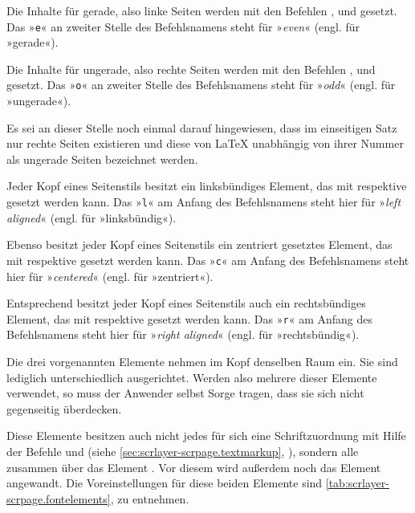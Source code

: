 Die Inhalte für gerade, also linke Seiten werden mit den
Befehlen ,  und  gesetzt. Das
»\texttt{e}« an zweiter Stelle des Befehlsnamens steht %
\iffalse dabei \fi %
für »\emph{even}« (engl. für »gerade«).

Die Inhalte für ungerade, also rechte Seiten werden mit
den Befehlen ,  und  gesetzt. Das
»\texttt{o}« an zweiter Stelle des Befehlsnamens steht %
\iffalse dabei \fi %
für »\emph{odd}« (engl. für »ungerade«).

Es sei an dieser Stelle noch einmal darauf hingewiesen,
dass im einseitigen Satz nur rechte Seiten existieren und diese von \LaTeX{}
unabhängig von ihrer Nummer als ungerade Seiten bezeichnet werden.

Jeder Kopf eines Seitenstils besitzt ein linksbündiges
Element, das mit  respektive  gesetzt werden
kann. Das »\texttt{l}« am Anfang des Befehlsnamens steht hier für »\emph{left
  aligned}« (engl. für »linksbündig«).

Ebenso besitzt jeder Kopf eines Seitenstils ein zentriert
gesetztes Element, das mit  respektive  gesetzt
werden kann. Das »\texttt{c}« am Anfang des Befehlsnamens steht hier für
»\emph{centered}« (engl. für »zentriert«).

Entsprechend besitzt jeder Kopf eines Seitenstils auch ein
rechtsbündiges Element, das mit 
respektive  gesetzt werden kann. Das »\texttt{r}« am Anfang des
Befehlsnamens steht hier für »\emph{right aligned}« (engl. für
»rechtsbündig«).

Die drei vorgenannten Elemente nehmen im Kopf denselben
Raum ein. Sie sind lediglich unterschiedlich ausgerichtet. Werden also mehrere
dieser Elemente verwendet, so muss der Anwender selbst Sorge tragen, dass sie
sich nicht gegenseitig überdecken.

\BeginIndexGroup
{}%
%
Diese Elemente besitzen auch nicht jedes für sich eine Schriftzuordnung mit
Hilfe der Befehle  und
 (siehe
\autoref{sec:scrlayer-scrpage.textmarkup},
), sondern alle zusammen über das
Element . Vor diesem
wird außerdem noch das Element
angewandt. Die Voreinstellungen für diese beiden Elemente sind
\autoref{tab:scrlayer-scrpage.fontelements},
 zu entnehmen.%
\EndIndexGroup

